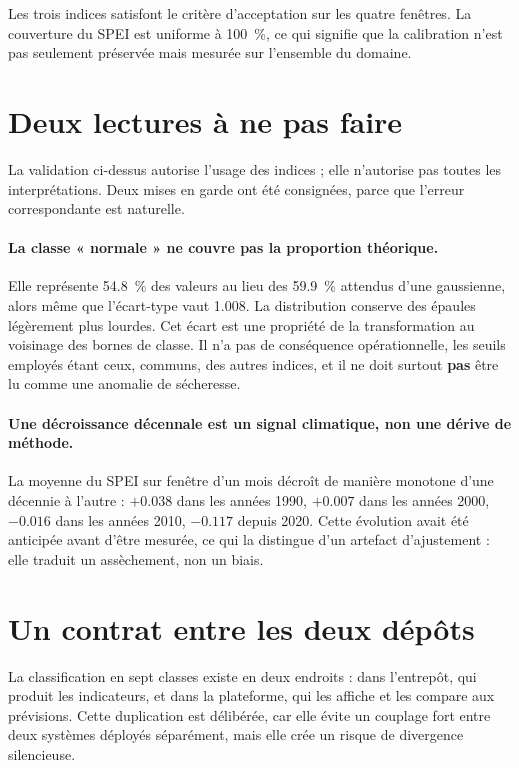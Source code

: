 Les trois indices satisfont le critère d'acceptation sur les quatre fenêtres. La couverture du
SPEI est uniforme à \SI{100}{\percent}, ce qui signifie que la calibration n'est pas seulement
préservée mais mesurée sur l'ensemble du domaine.

\section{Deux lectures à ne pas faire}

La validation ci-dessus autorise l'usage des indices ; elle n'autorise pas toutes les
interprétations. Deux mises en garde ont été consignées, parce que l'erreur correspondante est
naturelle.

\paragraph{La classe « normale » ne couvre pas la proportion théorique.} Elle représente
\SI{54,8}{\percent} des valeurs au lieu des \SI{59,9}{\percent} attendus d'une gaussienne, alors
même que l'écart-type vaut \num{1,008}. La distribution conserve des épaules légèrement plus
lourdes. Cet écart est une propriété de la transformation au voisinage des bornes de classe. Il
n'a pas de conséquence opérationnelle, les seuils employés étant ceux, communs, des autres
indices, et il ne doit surtout \textbf{pas} être lu comme une anomalie de sécheresse.

\paragraph{Une décroissance décennale est un signal climatique, non une dérive de méthode.} La
moyenne du SPEI sur fenêtre d'un mois décroît de manière monotone d'une décennie à l'autre :
$+\num{0,038}$ dans les années 1990, $+\num{0,007}$ dans les années 2000, $-\num{0,016}$ dans les
années 2010, $-\num{0,117}$ depuis 2020. Cette évolution avait été anticipée avant d'être
mesurée, ce qui la distingue d'un artefact d'ajustement : elle traduit un assèchement, non un
biais.

\section{Un contrat entre les deux dépôts}

La classification en sept classes existe en deux endroits : dans l'entrepôt, qui produit les
indicateurs, et dans la plateforme, qui les affiche et les compare aux prévisions. Cette
duplication est délibérée, car elle évite un couplage fort entre deux systèmes déployés
séparément, mais elle crée un risque de divergence silencieuse.

